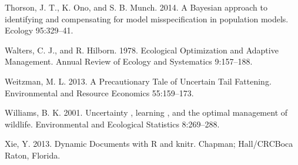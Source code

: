 \documentclass[author-year, 12pt,review]{components/elsarticle} %
\begin{document}
Thorson, J. T., K. Ono, and S. B. Munch. 2014. A Bayesian approach to
identifying and compensating for model misspecification in population
models. Ecology 95:329--41.

Walters, C. J., and R. Hilborn. 1978. Ecological Optimization and
Adaptive Management. Annual Review of Ecology and Systematics
9:157--188.

Weitzman, M. L. 2013. A Precautionary Tale of Uncertain Tail Fattening.
Environmental and Resource Economics 55:159--173.

Williams, B. K. 2001. Uncertainty , learning , and the optimal
management of wildlife. Environmental and Ecological Statistics
8:269--288.

Xie, Y. 2013. Dynamic Documents with R and knitr. Chapman; Hall/CRCBoca
Raton, Florida.
\end{document}
